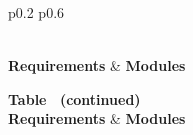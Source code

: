 \documentclass[12pt, titlepage]{article}
\begin{document}
\begin{longtable}{p{} p{}}
\caption{Trace Between Requirements and Modules} \label{TblRTFull} \\
\toprule
\textbf{Requirements} & \textbf{Modules}\\
\midrule
\endfirsthead

%
{{\bfseries Table \thetable\ (continued)}} \\
\toprule
\textbf{Requirements} & \textbf{Modules}\\
\midrule
\endhead

\bottomrule
{} \\
\endfoot

\bottomrule
\endlastfoot


\end{longtable}
\end{document}
